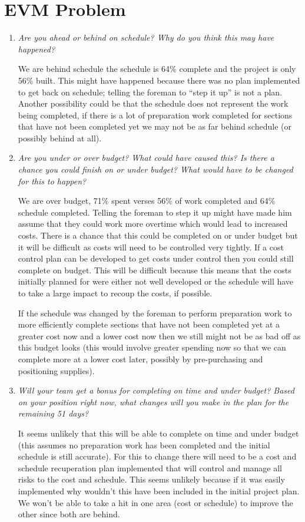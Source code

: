 \documentclass[letterpaper,10pt]{article}
\begin{document}
\section*{EVM Problem}
\begin{enumerate}
\item\emph{Are you ahead or behind on schedule? Why do you think this may have happened?}
\par We are behind schedule the schedule is 64\% complete and the project is only 56\% built.  This might have happened because there was no plan implemented to get back on schedule; telling the foreman to ``step it up'' is not a plan.  Another possibility could be that the schedule does not represent the work being completed, if there is a lot of preparation work completed for sections that have not been completed yet we may not be as far behind schedule (or possibly behind at all).

\item\emph{Are you under or over budget? What could have caused this? Is there a chance you could finish on or under budget? What would have to be changed for this to happen?}
\par We are over budget, 71\% spent verses 56\% of work completed and 64\% schedule completed.  Telling the foreman to step it up might have made him assume that they could work more overtime which would lead to increased costs.  There is a chance that this could be completed on or under budget but it will be difficult as costs will need to be controlled very tightly.  If a cost control plan can be developed to get costs under control then you could still complete on budget.  This will be difficult because this means that the costs initially planned for were either not well developed or the schedule will have to take a large impact to recoup the costs, if possible.
\par If the schedule was changed by the foreman to perform preparation work to more efficiently complete sections that have not been completed yet at a greater cost now and a lower cost now then we still might not be as bad off as this budget looks (this would involve greater spending now so that we can complete more at a lower cost later, possibly by pre-purchasing and positioning supplies).

\item\emph{Will your team get a bonus for completing on time and under budget? Based on your position right now, what changes will you make in the plan for the remaining 51 days?}
\par It seems unlikely that this will be able to complete on time and under budget (this assumes no preparation work has been completed and the initial schedule is still accurate).  For this to change there will need to be a cost and schedule recuperation plan implemented that will control and manage all risks to the cost and schedule.  This seems unlikely because if it was easily implemented why wouldn't this have been included in the initial project plan.  We won't be able to take a hit in one area (cost or schedule) to improve the other since both are behind.


\end{enumerate}
\end{document}
